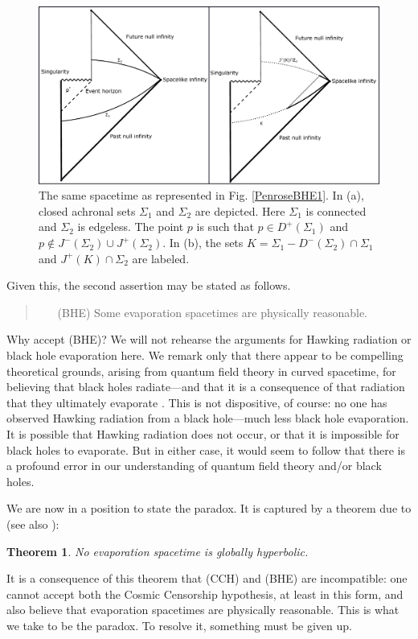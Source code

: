 \documentclass[authoryear,12pt,3p]{jowarticle}
\newtheorem{thm}{Theorem}
\begin{document}
\begin{figure}[h]    \centering
   \includegraphics[width=6in]{BHE_Penrose_Diagram2+3.pdf}
   \caption{\label{PenroseBHE2} The same spacetime as represented in Fig. \ref{PenroseBHE1}.  In (a), closed achronal sets $\Sigma_1$ and $\Sigma_2$ are depicted.  Here $\Sigma_1$ is connected and $\Sigma_2$ is edgeless.  The point $p$ is such that $p\in D^+(\Sigma_1)$ and $p\not\in J^-(\Sigma_2)\cup J^+(\Sigma_2)$.  In (b), the sets $K=\Sigma_1-D^-(\Sigma_2)\cap \Sigma_1$ and $J^+(K)\cap\Sigma_2$ are labeled.}
\end{figure}

Given this, the second assertion may be stated as follows.
\begin{quote}
\begin{itemize}
\item[(BHE)]\label{BHE} Some evaporation spacetimes are physically reasonable.
\end{itemize}
\end{quote}
Why accept (BHE)?  We will not rehearse the arguments for Hawking radiation or black hole evaporation here.  We remark only that there appear to be compelling theoretical grounds, arising from quantum field theory in curved spacetime, for believing that black holes radiate---and that it is a consequence of that radiation that they ultimately evaporate \citep{HawkingR1,HawkingR2,UnruhBHE,Birrell+Davies,Fulling,WaldQFTCST}.
This is not dispositive, of course: no one has observed Hawking radiation from a black hole---much less black hole evaporation.  It is possible that Hawking radiation does not occur, or that it is impossible for black holes to evaporate.  But in either case, it would seem to follow that there is a profound error in our understanding of quantum field theory and/or black holes.

We are now in a position to state the paradox.  It is captured by a theorem due to \citet{Kodama} (see also \citet{Wald1984}):
\begin{thm} No evaporation spacetime is globally hyperbolic.\end{thm}
It is a consequence of this theorem that (CCH) and (BHE) are incompatible: one cannot accept both the Cosmic Censorship hypothesis, at least in this form, and also believe that evaporation spacetimes are physically reasonable.  This is what we take to be the paradox.  To resolve it, something must be given up.
\end{document}

